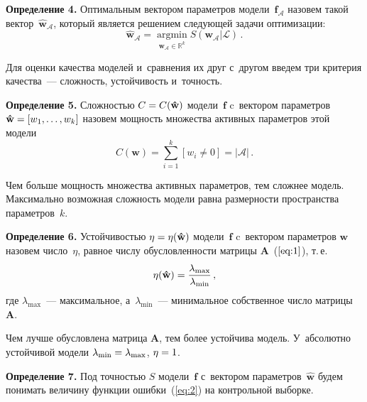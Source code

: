 \begin{multicols}{2}
\smallskip

\noindent
\textbf{Определение 4.}
Оптимальным вектором параметров модели~$\mathbf{f}_{\mathcal{A}}$  назовем
такой вектор~$\mathbf{\hat{w}}_{\mathcal{A}}$, который является решением
сле\-ду\-ющей задачи оптимизации:
\begin{equation}
\label{eq:4}
\mathbf{\hat{w}}_{\mathcal{A}} = \mathop{\arg\min}\limits_{{\mathbf{w}_{\mathcal{A}} \in \mathbb{R}^k}}S(\mathbf{w}_\mathcal{A}|\mathcal{L})\,.
\end{equation}


\smallskip

Для оценки качества моделей и~сравнения их друг с~другом введем три
критерия качества~--- сложность, устойчивость и~точность.

\smallskip

\noindent
\textbf{Определение 5.}
Сложностью $C \hm= C(\mathbf{\hat{w}})$ модели~$\mathbf{f}$ c~вектором
параметров $\mathbf{\hat{w}} \hm= [w_1, \dots, w_k]$ назовем мощность
множества активных параметров этой модели
\begin{equation*}
C(\mathbf{w})= \sum\limits_{i=1}^k[w_i \neq 0] = |\mathcal{A}|\,.
\end{equation*}


\smallskip

Чем больше мощность множества активных параметров, тем сложнее модель.
Максимально возможная сложность модели равна размерности пространства
параметров~$k$.

\smallskip

\noindent
\textbf{Определение 6.}
Устойчивостью $\eta \hm= \eta(\mathbf{\hat{w}})$ модели~$\mathbf{f}$
c~вектором параметров $\mathbf{w}$ назовем число~$\eta$, равное числу
обусловленности матрицы $\mathbf{A}$~($\ref{eq:1}$), т.\,е.
\begin{equation*}
\eta(\mathbf{\hat{w}})=\displaystyle\frac{\displaystyle \lambda_{\max}\mathstrut}{\displaystyle \lambda_{\min}\mathstrut}\,,
\end{equation*}
где $\lambda_{\max}$~--- максимальное, а~$\lambda_{\min}$~---
минимальное собственное число матрицы $\mathbf{A}$.


\smallskip

Чем лучше обусловлена матрица $\mathbf{A}$, тем более устойчива модель.
У~абсолютно устойчивой модели $\lambda_{\min} \hm= \lambda_{\max}$, $\eta \hm= 1$.


\smallskip

\noindent
\textbf{Определение 7.}
Под точностью $S$ модели~$\mathbf{f}$ с~вектором параметров~$\mathbf{\hat{w}}$
будем понимать величину функции ошибки~(\ref{eq:2}) на контрольной выборке.


\end{multicols}
